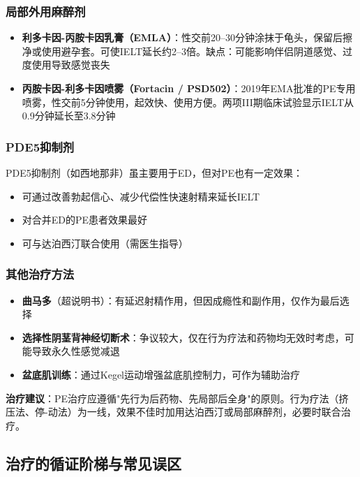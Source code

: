 \subsubsection{局部外用麻醉剂}

\begin{itemize}[leftmargin=2cm]
	\item \textbf{利多卡因-丙胺卡因乳膏（EMLA）}：性交前20--30分钟涂抹于龟头，保留后擦净或使用避孕套。可使IELT延长约2--3倍。缺点：可能影响伴侣阴道感觉、过度使用导致感觉丧失
	\item \textbf{丙胺卡因-利多卡因喷雾（Fortacin / PSD502）}：2019年EMA批准的PE专用喷雾，性交前5分钟使用，起效快、使用方便。两项III期临床试验显示IELT从0.9分钟延长至3.8分钟
\end{itemize}

\subsubsection{PDE5抑制剂}

PDE5抑制剂（如西地那非）虽主要用于ED，但对PE也有一定效果：
\begin{itemize}[leftmargin=2cm]
	\item 可通过改善勃起信心、减少代偿性快速射精来延长IELT
	\item 对合并ED的PE患者效果最好
	\item 可与达泊西汀联合使用（需医生指导）
\end{itemize}

\subsubsection{其他治疗方法}

\begin{itemize}[leftmargin=2cm]
	\item \textbf{曲马多}（超说明书）：有延迟射精作用，但因成瘾性和副作用，仅作为最后选择
	\item \textbf{选择性阴茎背神经切断术}：争议较大，仅在行为疗法和药物均无效时考虑，可能导致永久性感觉减退
	\item \textbf{盆底肌训练}：通过Kegel运动增强盆底肌控制力，可作为辅助治疗
\end{itemize}

\textbf{治疗建议}：PE治疗应遵循"先行为后药物、先局部后全身"的原则。行为疗法（挤压法、停-动法）为一线，效果不佳时加用达泊西汀或局部麻醉剂，必要时联合治疗。

\subsection{治疗的循证阶梯与常见误区}

